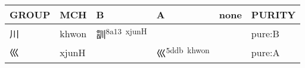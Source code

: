 \documentclass[14pt,a4paper]{scrartcl}
\begin{document}
\begin{longtable}[c]{@{}llllll@{}}
\toprule
\begin{minipage}[b]{0.14\columnwidth}\raggedright\strut
GROUP
\strut\end{minipage} &
\begin{minipage}[b]{0.14\columnwidth}\raggedright\strut
MCH
\strut\end{minipage} &
\begin{minipage}[b]{0.14\columnwidth}\raggedright\strut
B
\strut\end{minipage} &
\begin{minipage}[b]{0.14\columnwidth}\raggedright\strut
A
\strut\end{minipage} &
\begin{minipage}[b]{0.14\columnwidth}\raggedright\strut
none
\strut\end{minipage} &
\begin{minipage}[b]{0.14\columnwidth}\raggedright\strut
PURITY
\strut\end{minipage}\tabularnewline
\midrule
\endhead
\begin{minipage}[t]{0.14\columnwidth}\raggedright\strut
川
\strut\end{minipage} &
\begin{minipage}[t]{0.14\columnwidth}\raggedright\strut
khwon
\strut\end{minipage} &
\begin{minipage}[t]{0.14\columnwidth}\raggedright\strut
訓\textsuperscript{8a13~xjunH}
\strut\end{minipage} &
\begin{minipage}[t]{0.14\columnwidth}\raggedright\strut
\strut\end{minipage} &
\begin{minipage}[t]{0.14\columnwidth}\raggedright\strut
\strut\end{minipage} &
\begin{minipage}[t]{0.14\columnwidth}\raggedright\strut
pure:B
\strut\end{minipage}\tabularnewline
\begin{minipage}[t]{0.14\columnwidth}\raggedright\strut
巛
\strut\end{minipage} &
\begin{minipage}[t]{0.14\columnwidth}\raggedright\strut
xjunH
\strut\end{minipage} &
\begin{minipage}[t]{0.14\columnwidth}\raggedright\strut
\strut\end{minipage} &
\begin{minipage}[t]{0.14\columnwidth}\raggedright\strut
巛\textsuperscript{5ddb~khwon}
\strut\end{minipage} &
\begin{minipage}[t]{0.14\columnwidth}\raggedright\strut
\strut\end{minipage} &
\begin{minipage}[t]{0.14\columnwidth}\raggedright\strut
pure:A
\strut\end{minipage}\tabularnewline
\bottomrule
\end{longtable}
\end{document}
